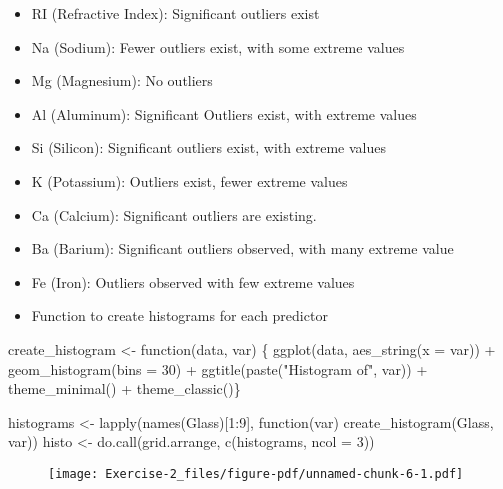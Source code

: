 \documentclass[
  letterpaper,
  DIV=11,
  numbers=noendperiod]{scrartcl}
\newenvironment{Shaded}{\begin{snugshade}}{\end{snugshade}}
\newcommand{\AttributeTok}[1]{\textcolor[rgb]{0.40,0.45,0.13}{#1}}
\newcommand{\ControlFlowTok}[1]{\textcolor[rgb]{0.00,0.23,0.31}{#1}}
\newcommand{\DecValTok}[1]{\textcolor[rgb]{0.68,0.00,0.00}{#1}}
\newcommand{\FunctionTok}[1]{\textcolor[rgb]{0.28,0.35,0.67}{#1}}
\newcommand{\NormalTok}[1]{\textcolor[rgb]{0.00,0.23,0.31}{#1}}
\newcommand{\OtherTok}[1]{\textcolor[rgb]{0.00,0.23,0.31}{#1}}
\newcommand{\SpecialCharTok}[1]{\textcolor[rgb]{0.37,0.37,0.37}{#1}}
\newcommand{\StringTok}[1]{\textcolor[rgb]{0.13,0.47,0.30}{#1}}
\begin{document}
\begin{itemize}
\item
  RI (Refractive Index): Significant outliers exist
\item
  Na (Sodium): Fewer outliers exist, with some extreme values
\item
  Mg (Magnesium): No outliers
\item
  Al (Aluminum): Significant Outliers exist, with extreme values
\item
  Si (Silicon): Significant outliers exist, with extreme values
\item
  K (Potassium): Outliers exist, fewer extreme values
\item
  Ca (Calcium): Significant outliers are existing.
\item
  Ba (Barium): Significant outliers observed, with many extreme value
\item
  Fe (Iron): Outliers observed with few extreme values
\item
  Function to create histograms for each predictor
\end{itemize}

\begin{Shaded}
\begin{Highlighting}[]
\NormalTok{create\_histogram }\OtherTok{\textless{}{-}} \ControlFlowTok{function}\NormalTok{(data, var) \{}
  \FunctionTok{ggplot}\NormalTok{(data, }\FunctionTok{aes\_string}\NormalTok{(}\AttributeTok{x =}\NormalTok{ var)) }\SpecialCharTok{+} 
    \FunctionTok{geom\_histogram}\NormalTok{(}\AttributeTok{bins =} \DecValTok{30}\NormalTok{) }\SpecialCharTok{+} 
    \FunctionTok{ggtitle}\NormalTok{(}\FunctionTok{paste}\NormalTok{(}\StringTok{"Histogram of"}\NormalTok{, var)) }\SpecialCharTok{+} 
    \FunctionTok{theme\_minimal}\NormalTok{() }\SpecialCharTok{+}
    \FunctionTok{theme\_classic}\NormalTok{()\}}


\NormalTok{histograms }\OtherTok{\textless{}{-}} \FunctionTok{lapply}\NormalTok{(}\FunctionTok{names}\NormalTok{(Glass)[}\DecValTok{1}\SpecialCharTok{:}\DecValTok{9}\NormalTok{], }\ControlFlowTok{function}\NormalTok{(var) }\FunctionTok{create\_histogram}\NormalTok{(Glass, var))}
\NormalTok{histo }\OtherTok{\textless{}{-}} \FunctionTok{do.call}\NormalTok{(grid.arrange, }\FunctionTok{c}\NormalTok{(histograms, }\AttributeTok{ncol =} \DecValTok{3}\NormalTok{))}
\end{Highlighting}
\end{Shaded}

\begin{figure}[H]

{\centering \texttt{[image: Exercise-2\_files/figure-pdf/unnamed-chunk-6-1.pdf]}

}

\end{figure}
\end{document}
